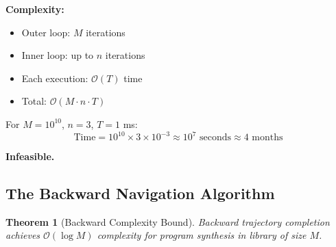 \documentclass[twocolumn,10pt]{article}
\newtheorem{theorem}{Theorem}[section]
\theoremstyle{definition}
\theoremstyle{remark}
\newcommand{\bigO}{\mathcal{O}}
\begin{document}
\textbf{Complexity:}
\begin{itemize}
\item Outer loop: $M$ iterations
\item Inner loop: up to $n$ iterations
\item Each execution: $\bigO(T)$ time
\item Total: $\bigO(M \cdot n \cdot T)$
\end{itemize}

For $M = 10^{10}$, $n = 3$, $T = 1$ ms:
\begin{equation}
\text{Time} = 10^{10} \times 3 \times 10^{-3} \approx 10^7 \text{ seconds} \approx 4 \text{ months}
\end{equation}

\textbf{Infeasible.}

\subsection{The Backward Navigation Algorithm}

\begin{theorem}[Backward Complexity Bound]
\label{thm:backward_complexity}
Backward trajectory completion achieves $\bigO(\log M)$ complexity for program synthesis in library of size $M$.
\end{theorem}
\end{document}
